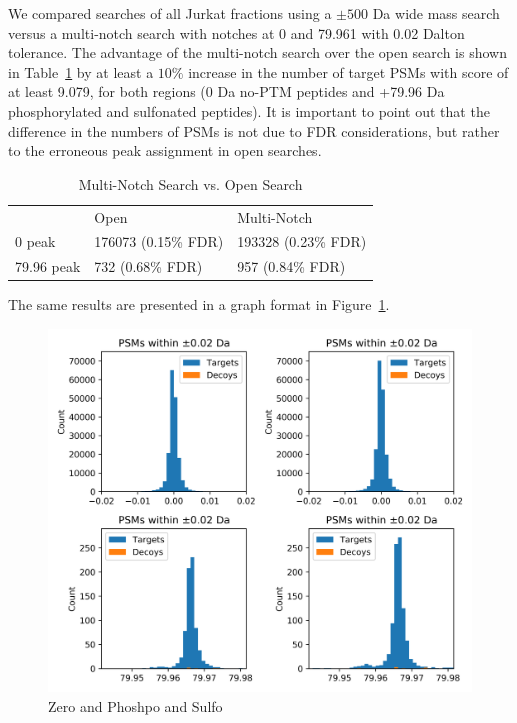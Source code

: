 \documentclass[journal=jprobs,manuscript=article]{achemso}
\begin{document}
We compared searches of all Jurkat fractions using a $\pm 500$ Da wide mass search versus a multi-notch search with notches at 0 and 79.961 with 0.02 Dalton tolerance.
The advantage of the multi-notch search over the open search is shown in Table~\ref{tbl:multiVsWide} by at least a $10\%$ increase in the number of target PSMs with score of at least 9.079, for both regions (0 Da no-PTM peptides and +79.96 Da phosphorylated and sulfonated peptides).
It is important to point out that the difference in the numbers of PSMs is not due to FDR considerations, but rather to the erroneous peak assignment in open searches.

\begin{table}[]
\centering
\caption{Multi-Notch Search vs. Open Search}
\label{tbl:multiVsWide}
\begin{tabular}{lll}
                    & Open & Multi-Notch\\
0 peak    & 176073  (0.15\% FDR)     & 193328 (0.23\% FDR)     \\
79.96 peak     & 732   (0.68\% FDR)   & 957  (0.84\% FDR)           \\
\end{tabular}
\end{table}

The same results are presented in a graph format in Figure~\ref{fig:fig6-ZeroAndPhospho}.

\begin{figure}[H]
\includegraphics{fig6-ZeroAndPhospho.png}
\caption{Zero and Phoshpo and Sulfo}
\label{fig:fig6-ZeroAndPhospho}
\end{figure}
\end{document}
